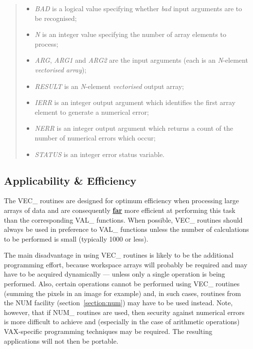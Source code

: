 \documentclass[11pt,nolof]{starlink}
\providecommand{\name}[1]{\mbox{#1}}
\providecommand{\fortvar}[1]{\mbox{\emph{#1}}}
\begin{document}
\begin{quote}
\begin{itemize}

\item \fortvar{BAD} is a logical value specifying whether \emph{bad}
input arguments are to be recognised;

\item \fortvar{N} is an integer value specifying the number of array
elements to process;

\item \fortvar{ARG}, \fortvar{ARG1} and \fortvar{ARG2} are the input
arguments (each is an \fortvar{N}-element \emph{vectorised array});

\item \fortvar{RESULT} is an \fortvar{N}-element \emph{vectorised} output
array;

\item \fortvar{IERR} is an integer output argument which identifies the
first array element to generate a numerical error;

\item \fortvar{NERR} is an integer output argument which returns a count of the
number of numerical errors which occur;

\item \fortvar{STATUS} is an integer error status variable.

\end{itemize}
\end{quote}

\subsection{Applicability \& Efficiency}

The \name{VEC\_} routines are designed for optimum efficiency when
processing large arrays of data and are consequently \textbf{\underline{far}}
more efficient at performing this task than the corresponding \name{VAL\_}
functions.
When possible, \name{VEC\_} routines should always be used in preference to
\name{VAL\_} functions unless the number of calculations to be performed is
small (typically 1000 or less).

The main disadvantage in using \name{VEC\_} routines is likely to be the
additional programming effort, because workspace arrays will probably be
required and may have to be acquired dynamically --- unless only a single
operation is being performed.
Also, certain operations cannot be performed using \name{VEC\_} routines
(summing the pixels in an image for example) and, in such cases,
routines from the \name{NUM} facility (section~\ref{section:num}) may have
to be used instead.
Note, however, that if \name{NUM\_} routines are used, then security against
numerical errors is more difficult to achieve and (especially in the case of
arithmetic operations) \name{VAX}-specific programming techniques may be
required.
The resulting applications will not then be portable.
\end{document}
